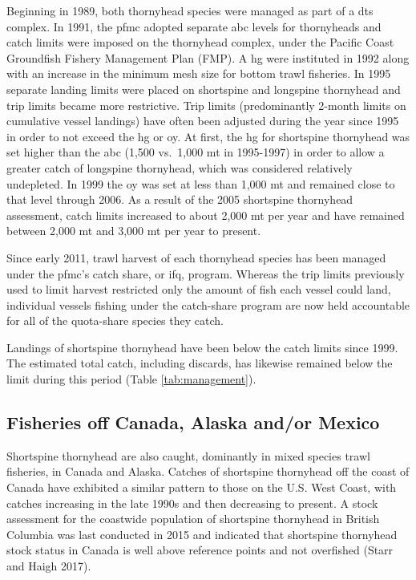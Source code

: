 \documentclass[11pt,
  english,
  letterpaper,
]{article}
\begin{document}
Beginning in 1989, both thornyhead species were managed as part of a \gls{dts} complex. In 1991, the \gls{pfmc} adopted separate \gls{abc} levels for thornyheads and catch limits were imposed on the thornyhead complex, under the Pacific Coast Groundfish Fishery Management Plan (FMP). A \Gls{hg} were instituted in 1992 along with an increase in the minimum mesh size for bottom trawl fisheries. In 1995 separate landing limits were placed on shortspine and longspine thornyhead and trip limits became more restrictive. Trip limits (predominantly 2-month limits on cumulative vessel landings) have often been adjusted during the year since 1995 in order to not exceed the \Gls{hg} or \gls{oy}. At first, the \gls{hg} for shortspine thornyhead was set higher than the \gls{abc} (1,500 vs.~1,000 mt in 1995-1997) in order to allow a greater catch of longspine thornyhead, which was considered relatively undepleted. In 1999 the \gls{oy} was set at less than 1,000 mt and remained close to that level through 2006. As a result of the 2005 shortspine thornyhead assessment, catch limits increased to about 2,000 mt per year and have remained between 2,000 mt and 3,000 mt per year to present.

Since early 2011, trawl harvest of each thornyhead species has been managed under the \gls{pfmc}'s catch share, or \gls{ifq}, program. Whereas the trip limits previously used to limit harvest restricted only the amount of fish each vessel could land, individual vessels fishing under the catch-share program are now held accountable for all of the quota-share species they catch.

Landings of shortspine thornyhead have been below the catch limits since 1999. The estimated total catch, including discards, has likewise remained below the limit during this period (Table \ref{tab:management}).

\hypertarget{fisheries-off-canada-alaska-andor-mexico}{%
\subsection{Fisheries off Canada, Alaska and/or Mexico}\label{fisheries-off-canada-alaska-andor-mexico}}

Shortspine thornyhead are also caught, dominantly in mixed species trawl fisheries, in Canada and Alaska. Catches of shortspine thornyhead off the coast of Canada have exhibited a similar pattern to those on the U.S. West Coast, with catches increasing in the late 1990s and then decreasing to present. A stock assessment for the coastwide population of shortspine thornyhead in British Columbia was last conducted in 2015 and indicated that shortspine thornyhead stock status in Canada is well above reference points and not overfished (Starr and Haigh 2017).
\end{document}
